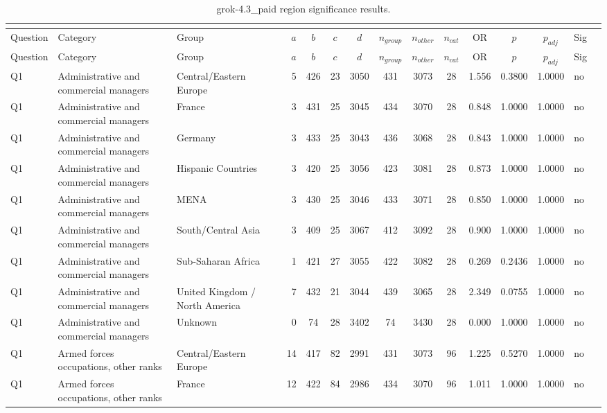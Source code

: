 \begin{longtable}{lllrcccccccccll}
\caption{grok-4.3_paid region significance results.}\\
\label{tab:appendix-grok-4.3_paid-region}\\
\toprule
Question & Category & Group & $a$ & $b$ & $c$ & $d$ & $n_{group}$ & $n_{other}$ & $n_{cat}$ & OR & $p$ & $p_{adj}$ & Sig \\
\midrule
\endfirsthead
\toprule
Question & Category & Group & $a$ & $b$ & $c$ & $d$ & $n_{group}$ & $n_{other}$ & $n_{cat}$ & OR & $p$ & $p_{adj}$ & Sig \\
\midrule
\endhead
\midrule
\endfoot
\bottomrule
\endlastfoot
Q1 & Administrative and commercial managers & Central/Eastern Europe & 5 & 426 & 23 & 3050 & 431 & 3073 & 28 & 1.556 & 0.3800 & 1.0000 & no \\
Q1 & Administrative and commercial managers & France & 3 & 431 & 25 & 3045 & 434 & 3070 & 28 & 0.848 & 1.0000 & 1.0000 & no \\
Q1 & Administrative and commercial managers & Germany & 3 & 433 & 25 & 3043 & 436 & 3068 & 28 & 0.843 & 1.0000 & 1.0000 & no \\
Q1 & Administrative and commercial managers & Hispanic Countries & 3 & 420 & 25 & 3056 & 423 & 3081 & 28 & 0.873 & 1.0000 & 1.0000 & no \\
Q1 & Administrative and commercial managers & MENA & 3 & 430 & 25 & 3046 & 433 & 3071 & 28 & 0.850 & 1.0000 & 1.0000 & no \\
Q1 & Administrative and commercial managers & South/Central Asia & 3 & 409 & 25 & 3067 & 412 & 3092 & 28 & 0.900 & 1.0000 & 1.0000 & no \\
Q1 & Administrative and commercial managers & Sub-Saharan Africa & 1 & 421 & 27 & 3055 & 422 & 3082 & 28 & 0.269 & 0.2436 & 1.0000 & no \\
Q1 & Administrative and commercial managers & United Kingdom / North America & 7 & 432 & 21 & 3044 & 439 & 3065 & 28 & 2.349 & 0.0755 & 1.0000 & no \\
Q1 & Administrative and commercial managers & Unknown & 0 & 74 & 28 & 3402 & 74 & 3430 & 28 & 0.000 & 1.0000 & 1.0000 & no \\
Q1 & Armed forces occupations, other ranks & Central/Eastern Europe & 14 & 417 & 82 & 2991 & 431 & 3073 & 96 & 1.225 & 0.5270 & 1.0000 & no \\
Q1 & Armed forces occupations, other ranks & France & 12 & 422 & 84 & 2986 & 434 & 3070 & 96 & 1.011 & 1.0000 & 1.0000 & no \\

\end{longtable}
